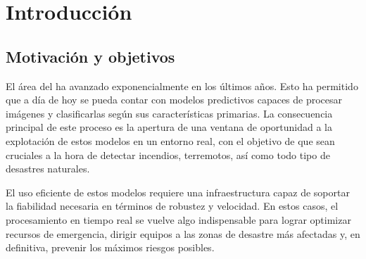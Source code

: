 \cleardoublepage

\usepackage{pgfgantt}
\chapter{Introducción}
\label{ch:chapter1}


\section{Motivación y objetivos}\label{sec:motivación-y-objetivos}

El área del  ha avanzado exponencialmente en los últimos años.
Esto ha permitido que a día de hoy se pueda contar con modelos predictivos capaces de procesar imágenes y clasificarlas según sus características primarias.
La consecuencia principal de este proceso es la apertura de una ventana de oportunidad a la explotación de estos modelos en un entorno real, con el objetivo de que sean cruciales a
la hora de detectar incendios, terremotos, así como todo tipo de desastres naturales.


El uso eficiente de estos modelos requiere una infraestructura capaz de soportar la fiabilidad necesaria en términos de robustez y velocidad.
En estos casos, el procesamiento en tiempo real se vuelve algo indispensable para lograr optimizar recursos de emergencia, dirigir equipos a las zonas de desastre más afectadas y, en definitiva, prevenir los máximos riesgos posibles.


